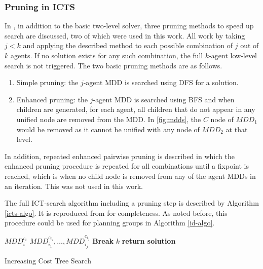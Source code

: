 \documentclass[english]{article}
\begin{document}
	\subsubsection{Pruning in ICTS}
	\label{pruning}
	In \cite{sharon2011}, in addition to the basic two-level solver, three pruning methods to speed up search are discussed, two of which were used in this work. All work by taking $j < k$ and applying the described method to each possible combination of $j$ out of $k$ agents. If no solution exists for any such combination, the full $k$-agent low-level search is not triggered. The two basic pruning methods are as follows.
	\begin{enumerate}
		\item Simple pruning: the $j$-agent MDD is searched using DFS for a solution.
		\item Enhanced pruning: the $j$-agent MDD is searched using BFS and when children are generated, for each agent, all children that do not appear in any unified node are removed from the MDD. In \ref{fig:mdds}, the $C$ node of $MDD_1$ would be removed as it cannot be unified with any node of $MDD_2$ at that level. 
	\end{enumerate}
	In addition, repeated enhanced pairwise pruning is described in which the enhanced pruning procedure is repeated for all combinations until a fixpoint is reached, which is when no child node is removed from any of the agent MDDs in an iteration. This was not used in this work. 
	
	The full ICT-search algorithm including a pruning step is described by Algorithm \ref{icts-algo}. It is reproduced from \cite{sharon2011} for completeness. As noted before, this procedure could be used for planning groups in Algorithm \ref{id-algo}. 
	\begin{algorithm}
		\begin{algorithmic}[1]
			\State {}
					 $MDD_i^{c_i}$
				\EndFor
				\State {}$MDD_{i_1}^{c_{i_1}},\ldots,MDD_{i_j}^{c_{i_j}}$
					\State \textbf{Break}
				\EndIf
				\EndFor
				\State {}$k$
				\State \textbf{return solution}
				\EndIf
			\EndFor

			\EndProcedure
		\end{algorithmic}
		\caption{Increasing Cost Tree Search}
		\label{icts-algo}
	\end{algorithm}
\end{document}
